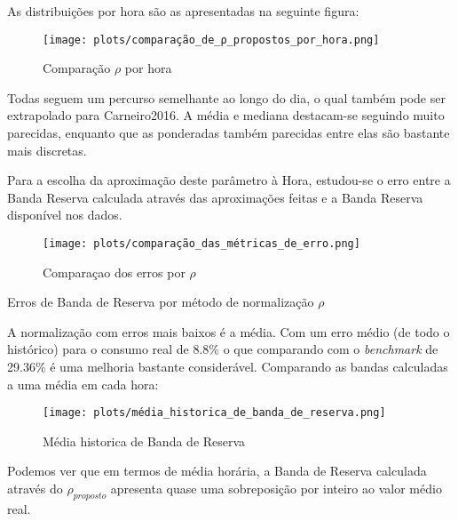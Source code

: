 As distribuições por hora são as apresentadas na seguinte figura:

\begin{figure}[H]
    \centering
    \texttt{[image: plots/comparação\_de\_ρ\_propostos\_por\_hora.png]}
    \caption{Comparação $\rho$ por hora}
    \label{fig:comparação_de_ρ_propostos_por_hora}
\end{figure}

Todas seguem um percurso semelhante ao longo do dia, o qual também pode ser extrapolado para Carneiro2016. A média e mediana destacam-se seguindo muito parecidas, enquanto que as ponderadas também parecidas entre elas são bastante mais discretas.\par
Para a escolha da aproximação deste parâmetro à Hora, estudou-se o erro entre a Banda Reserva calculada através das aproximações feitas e a Banda Reserva disponível nos dados.\par


\begin{figure}[H]
    \centering
    \texttt{[image: plots/comparação\_das\_métricas\_de\_erro.png]}
    \caption{Comparaçao dos erros por $\rho$}
    \label{fig:comparação_das_métricas_de_erro}
\end{figure}


\begin{table}[H]
    \centering
    \caption{Erros de Banda de Reserva por método de normalização $\rho$}    
    \resizebox{0.65\linewidth}{!}{}
    \label{fig:tabela_estudo_1_medias}
    \end{table}


A normalização com erros mais baixos é a média. Com um erro médio (de todo o histórico) para o consumo real de 8.8\% o que comparando com o \textit{benchmark} de 29.36\% é uma melhoria  bastante considerável. Comparando as bandas calculadas a uma média em cada hora:\par

\begin{figure}[H]
    \centering
    \texttt{[image: plots/média\_historica\_de\_banda\_de\_reserva.png]}
    \caption{Média historica de Banda de Reserva}
\end{figure}

Podemos ver que em termos de média horária, a Banda de Reserva calculada através do $\rho_{proposto}$ apresenta quase uma sobreposição por inteiro ao valor médio real.\par

